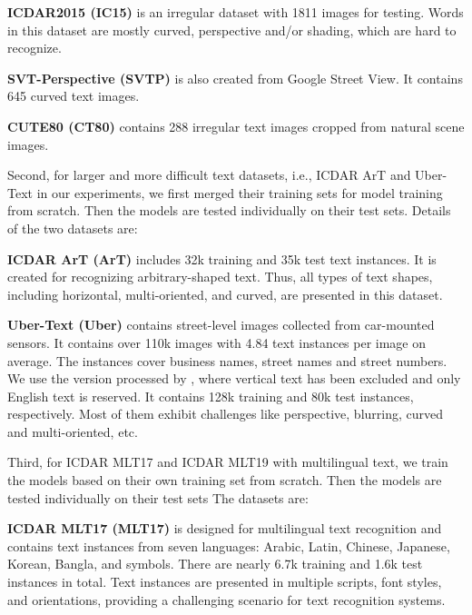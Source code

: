 \noindent\textbf{ICDAR2015 (IC15)} \citep{ICDAR2015} 
is an irregular dataset with 1811 images for testing. Words in this dataset are mostly curved, perspective and/or shading, which are hard to recognize.

\noindent\textbf{SVT-Perspective (SVTP)} \citep{SVT-P} 
is also created from Google Street View. It contains 645 curved text images. 

\noindent\textbf{CUTE80 (CT80)} \citep{CUTE80} 
contains 288 irregular text images cropped from natural scene images.

Second, for larger and more difficult text datasets, i.e., ICDAR ArT \citep{chng2019art} and Uber-Text \citep{zhang2017uber} in our experiments, we first merged their training sets for model training from scratch. Then the models are tested individually on their test sets. Details of the two datasets are:

\noindent\textbf{ICDAR ArT (ArT)} \citep{chng2019art}
includes 32k training and 35k test text instances. It is created for recognizing arbitrary-shaped text. Thus, all types of text shapes, including horizontal, multi-oriented, and curved, are presented in this dataset. 


\noindent\textbf{Uber-Text (Uber)} \citep{zhang2017uber} 
contains street-level images collected from car-mounted sensors. It contains over 110k images with 4.84 text instances per image on average. The instances cover business names, street names and street numbers. We use the version processed by \cite{baek2021realdataset}, where vertical text has been excluded and only English text is reserved. It contains 128k training and 80k test instances, respectively. Most of them exhibit challenges like perspective, blurring, curved and multi-oriented, etc.

Third, for ICDAR MLT17 \citep{nayef2017mlt17} and ICDAR MLT19 \citep{nayef2019mlt19} with multilingual text, we train the models based on their own training set from scratch. Then the models are tested individually on their test sets 
The datasets are:


\noindent\textbf{ICDAR MLT17 (MLT17)} \citep{nayef2017mlt17} is designed for multilingual text recognition and contains text instances from seven languages: Arabic, Latin, Chinese, Japanese, Korean, Bangla, and symbols. There are nearly 6.7k training and 1.6k test instances in total. Text instances are presented in multiple scripts, font styles, and orientations, providing a challenging scenario for text recognition systems.

